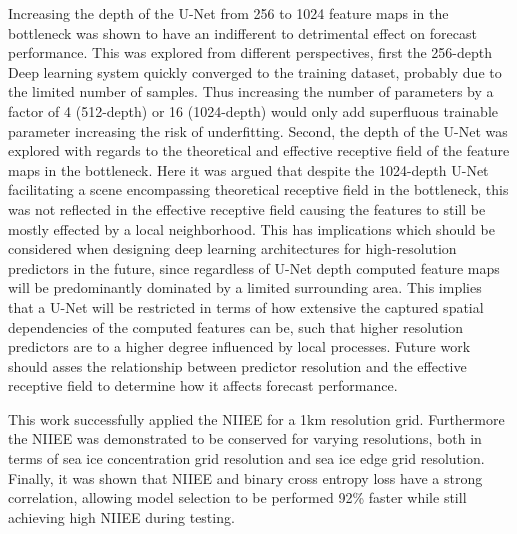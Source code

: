 \documentclass[../main/thesis.tex]{subfiles}
\begin{document}
Increasing the depth of the U-Net from 256 to 1024 feature maps in the bottleneck was shown to have an indifferent to detrimental effect on forecast performance. This was explored from different perspectives, first the 256-depth Deep learning system quickly converged to the training dataset, probably due to the limited number of samples. Thus increasing the number of parameters by a factor of 4 (512-depth) or 16 (1024-depth) would only add superfluous trainable parameter increasing the risk of underfitting. Second, the depth of the U-Net was explored with regards to the theoretical and effective receptive field of the feature maps in the bottleneck. Here it was argued that despite the 1024-depth U-Net facilitating a scene encompassing theoretical receptive field in the bottleneck, this was not reflected in the effective receptive field causing the features to still be mostly effected by a local neighborhood. This has implications which should be considered when designing deep learning architectures for high-resolution predictors in the future, since regardless of U-Net depth computed feature maps will be predominantly dominated by a limited surrounding area. This implies that a U-Net will be restricted in terms of how extensive the captured spatial dependencies of the computed features can be, such that higher resolution predictors are to a higher degree influenced by local processes. Future work should asses the relationship between predictor resolution and the effective receptive field to determine how it affects forecast performance.

This work successfully applied the NIIEE for a 1km resolution grid. Furthermore the NIIEE was demonstrated to be conserved for varying resolutions, both in terms of sea ice concentration grid resolution and sea ice edge grid resolution. Finally, it was shown that NIIEE and binary cross entropy loss have a strong correlation, allowing model selection to be performed 92\% faster while still achieving high NIIEE during testing.
\end{document}
